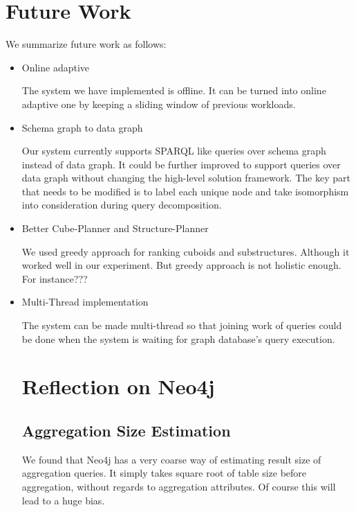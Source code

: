 \section{Future Work}
We summarize future work as follows:

\begin{itemize}
\item Online adaptive

The system we have implemented is offline. It can be turned into online adaptive one by keeping a sliding window of previous workloads. 

\item Schema graph to data graph

Our system currently supports SPARQL like queries over schema graph instead of data graph. It could be further improved to support queries over data graph without changing the high-level solution framework. The key part that needs to be modified is to label each unique node and take isomorphism into consideration during query decomposition.  

\item Better Cube-Planner and Structure-Planner

We used greedy approach for ranking cuboids and substructures. Although it worked well in our experiment. But greedy approach is not holistic enough. For instance???

\item Multi-Thread implementation

The system can be made multi-thread so that joining work of queries could be done when the system is waiting for graph database’s query execution. 
\begin{itemize}
\section{Reflection on Neo4j}
\subsection{Aggregation Size Estimation}
We found that Neo4j has a very coarse way of estimating result size of aggregation queries. It simply takes square root of table size before aggregation, without regards to aggregation attributes. Of course this will lead to a huge bias. 


\end{itemize}
\end{itemize}
